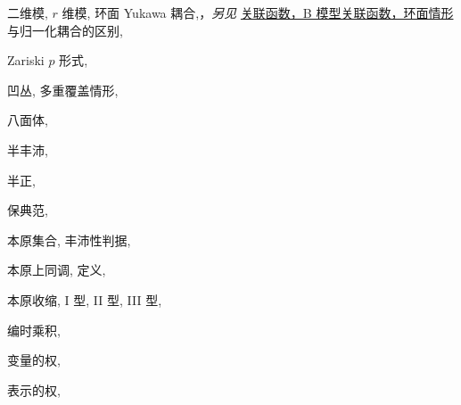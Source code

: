 \begin{theindex}
\subsubitem \leavevmode\hypertarget{idx:1454}{二维模},\enspace{}
\subsubitem \leavevmode\hypertarget{idx:1455}{$r$ 维模},\enspace{}
\subitem \leavevmode\hypertarget{idx:1456}{环面 Yukawa 耦合},\enspace{}，\textit{另见} \hyperlink{idx:0190}{关联函数，B 模型关联函数，环面情形}
\subsubitem \leavevmode\hypertarget{idx:1457}{与归一化耦合的区别},\enspace{}
\indexspace
\item \leavevmode\hypertarget{idx:1458}{Zariski $p$ 形式},\enspace{}
\indexspace
\item \leavevmode\hypertarget{idx:0144}{凹丛},\enspace{}
\subitem \leavevmode\hypertarget{idx:0145}{多重覆盖情形},\enspace{}
\indexspace
\item \leavevmode\hypertarget{idx:0965}{八面体},\enspace{}
\indexspace
\item \leavevmode\hypertarget{idx:1244}{半丰沛},\enspace{}
\indexspace
\item \leavevmode\hypertarget{idx:1245}{半正},\enspace{}
\indexspace
\item \leavevmode\hypertarget{idx:0204}{保典范},\enspace{}
\indexspace
\item \leavevmode\hypertarget{idx:1087}{本原集合},\enspace{}
\subitem \leavevmode\hypertarget{idx:1088}{丰沛性判据},\enspace{}
\indexspace
\item \leavevmode\hypertarget{idx:1085}{本原上同调},\enspace{}
\subitem \leavevmode\hypertarget{idx:1086}{定义},\enspace{}
\indexspace
\item \leavevmode\hypertarget{idx:1089}{本原收缩},\enspace{}
\subitem \leavevmode\hypertarget{idx:1090}{I 型},\enspace{}
\subitem \leavevmode\hypertarget{idx:1091}{II 型},\enspace{}
\subitem \leavevmode\hypertarget{idx:1092}{III 型},\enspace{}
\indexspace
\item \leavevmode\hypertarget{idx:1334}{编时乘积},\enspace{}
\indexspace
\item \leavevmode\hypertarget{idx:1438}{变量的权},\enspace{}
\indexspace
\item \leavevmode\hypertarget{idx:1434}{表示的权},\enspace{}

\end{theindex}
